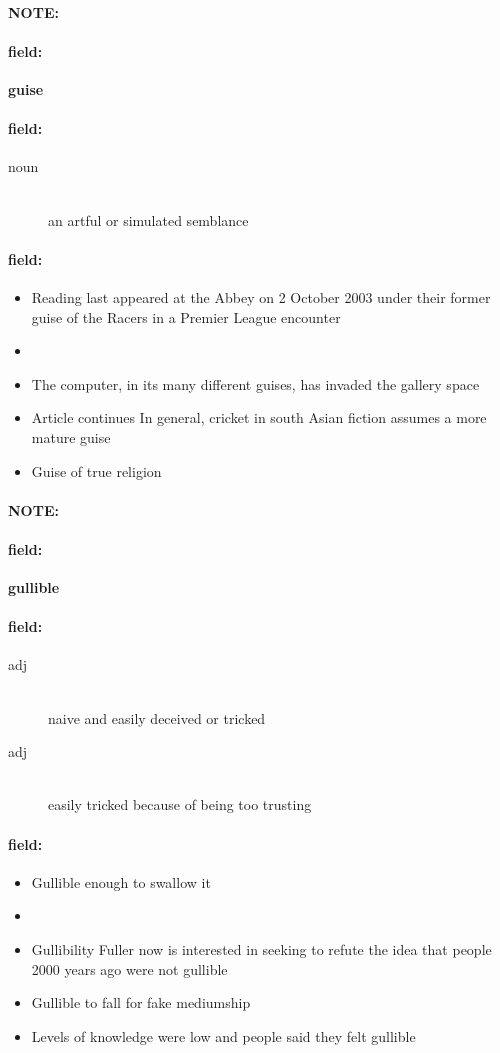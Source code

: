 \documentclass[12pt]{article}
\newenvironment{note}{\paragraph{NOTE:}}{}
\newenvironment{field}{\paragraph{field:}}{}
\begin{document}
\begin{note}
\begin{field}
\textbf{\large guise}
\end{field}


\begin{field}
\begin{description}
\item[noun] \hfill \\ 
an artful or simulated semblance

\end{description}
\end{field}

\begin{field}
\begin{itemize}
\item Reading last appeared at the Abbey on 2 October 2003 under their former guise of the Racers in a Premier League encounter
\item  
\item The computer, in its many different guises, has invaded the gallery space
\item Article continues In general, cricket in south Asian fiction assumes a more mature guise
\item Guise of true religion
\end{itemize}
\end{field}
\end{note}
\begin{note}
\begin{field}
\textbf{\large gullible}
\end{field}


\begin{field}
\begin{description}
\item[adj] \hfill \\ 
naive and easily deceived or tricked

\item[adj] \hfill \\ 
easily tricked because of being too trusting

\end{description}
\end{field}

\begin{field}
\begin{itemize}
\item Gullible enough to swallow it
\item 
\item Gullibility Fuller now is interested in seeking to refute the idea that people 2000 years ago were not gullible
\item Gullible to fall for fake mediumship
\item Levels of knowledge were low and people said they felt gullible
\end{itemize}
\end{field}
\end{note}
\end{document}
